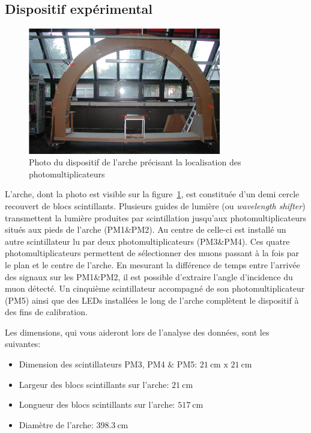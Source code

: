 \subsection{Dispositif expérimental}

\begin{figure}
\begin{center}
    \includegraphics[width=0.75\textwidth]{figures/dispositif_arche.png}
\end{center}
\caption{Photo du dispositif de l'arche précisant la localisation des photomultiplicateurs}
\label{fig:dispositif_arche}
\end{figure}

L'arche, dont la photo est visible sur la figure~\ref{fig:dispositif_arche}, est constituée d'un demi cercle recouvert de blocs scintillants.
Plusieurs guides de lumière (ou \textit{wavelength shifter}) transmettent la lumière produites par scintillation jusqu'aux photomultiplicateurs situés aux pieds de l'arche (PM1\&PM2).
Au centre de celle-ci est installé un autre scintillateur lu par deux photomultiplicateurs (PM3\&PM4).
Ces quatre photomultiplicateurs permettent de sélectionner des muons passant à la fois par le plan et le centre de l'arche.
En mesurant la différence de temps entre l'arrivée des signaux sur les PM1\&PM2, il est possible d'extraire l'angle d'incidence du muon détecté.
Un cinquième scintillateur accompagné de son photomultiplicateur (PM5) ainsi que des LEDs installées le long de l'arche complètent le dispositif à des fins de calibration.

Les dimensions, qui vous aideront lors de l'analyse des données, sont les suivantes:
\begin{itemize}
    \item Dimension des scintillateurs PM3, PM4 \& PM5: \(\SI{21}{\cm}\textrm{ x }\SI{21}{\cm}\)
    \item Largeur des blocs scintillants sur l'arche: \(\SI{21}{\cm}\)
    \item Longueur des blocs scintillants sur l'arche: \(\SI{517}{\cm}\)
    \item Diamètre de l'arche: \(\SI{398.3}{\cm}\)
\end{itemize}

